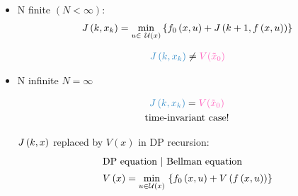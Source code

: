 \begin{itemize}
    \def\pink{\color[rgb]{1,0.39215686,0.74509804}}
    \def\blue{\color[rgb]{0.20392157,0.54901961,0.78431373}}
    
\item N finite $(N<\infty)$:
    \begin{align*}
    J \paren{k,x_k} = \min_{u \in~ \setU{x}}
        \set{ f_0 \paren{x, u} + J \paren{k+1, f \paren{x,u}} }
    \end{align*}
    \begin{figure}[H]
    \centering
    \def\svgwidth{\columnwidth}
    
    \begin{align*}
    {\blue J \paren{k,x_k} } \neq \pink V(\tilde{x}_0)
    \end{align*}
    \end{figure}    
    
\item N infinite $N = \infty$

    \begin{figure}[H]
    \centering
    \def\svgwidth{\columnwidth}
        
    \begin{gather*}
    {\blue J \paren{k,x_k} } = \pink V(\tilde{x}_0)\\
    \txt{time-invariant case!}
    \end{gather*}
    \end{figure}
    
    $J \left( k,x \right)$ replaced by $V(x)$ in DP recursion:
    \begin{align}
    \intertext{DP equation | Bellman equation}
    V \paren{x} = \minux{} \set{ f_0 \paren{x,u} + V \paren{f \paren{x,u}} }
    \label{eq:dp-bellman}
    \end{align}
\end{itemize}

